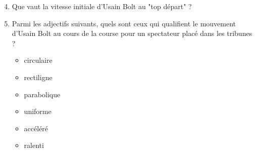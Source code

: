 \documentclass[11pt]{article}
\begin{document}
\begin{enumerate}
 \setcounter{enumi}{3}
 \item \app Que vaut la vitesse initiale d'Usain Bolt au "top départ" ?
 
 
 \medskip
 \item \rco Parmi les adjectifs suivants, quels sont ceux qui qualifient le mouvement d'Usain Bolt au cours de la course pour un spectateur placé dans les tribunes ? 
 
 
 \begin{multicols}{6}
 \begin{itemize}
  \item circulaire
  \item rectiligne
  \item parabolique
  \item uniforme
  \item accéléré
  \item ralenti
 \end{itemize}
\end{multicols}
 
 \end{enumerate}
 
 
\end{document}
